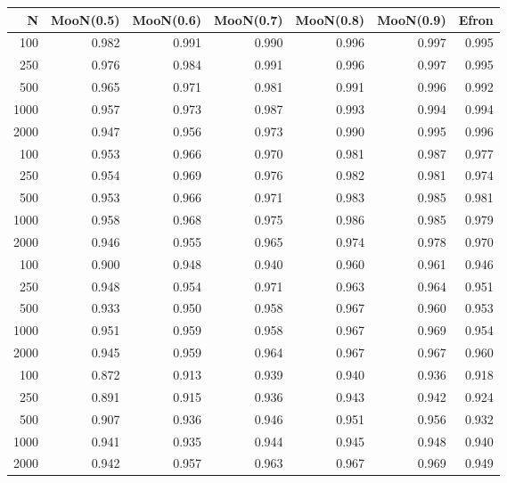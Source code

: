 \begin{table}[ht]
\centering
\begin{tabular}{rrrrrrr}
  \hline
N & MooN(0.5) & MooN(0.6) & MooN(0.7) & MooN(0.8) & MooN(0.9) & Efron \\ 
  \hline
100 & 0.982 & 0.991 & 0.990 & 0.996 & 0.997 & 0.995 \\ 
  250 & 0.976 & 0.984 & 0.991 & 0.996 & 0.997 & 0.995 \\ 
  500 & 0.965 & 0.971 & 0.981 & 0.991 & 0.996 & 0.992 \\ 
  1000 & 0.957 & 0.973 & 0.987 & 0.993 & 0.994 & 0.994 \\ 
  2000 & 0.947 & 0.956 & 0.973 & 0.990 & 0.995 & 0.996 \\ 
  100 & 0.953 & 0.966 & 0.970 & 0.981 & 0.987 & 0.977 \\ 
  250 & 0.954 & 0.969 & 0.976 & 0.982 & 0.981 & 0.974 \\ 
  500 & 0.953 & 0.966 & 0.971 & 0.983 & 0.985 & 0.981 \\ 
  1000 & 0.958 & 0.968 & 0.975 & 0.986 & 0.985 & 0.979 \\ 
  2000 & 0.946 & 0.955 & 0.965 & 0.974 & 0.978 & 0.970 \\ 
  100 & 0.900 & 0.948 & 0.940 & 0.960 & 0.961 & 0.946 \\ 
  250 & 0.948 & 0.954 & 0.971 & 0.963 & 0.964 & 0.951 \\ 
  500 & 0.933 & 0.950 & 0.958 & 0.967 & 0.960 & 0.953 \\ 
  1000 & 0.951 & 0.959 & 0.958 & 0.967 & 0.969 & 0.954 \\ 
  2000 & 0.945 & 0.959 & 0.964 & 0.967 & 0.967 & 0.960 \\ 
  100 & 0.872 & 0.913 & 0.939 & 0.940 & 0.936 & 0.918 \\ 
  250 & 0.891 & 0.915 & 0.936 & 0.943 & 0.942 & 0.924 \\ 
  500 & 0.907 & 0.936 & 0.946 & 0.951 & 0.956 & 0.932 \\ 
  1000 & 0.941 & 0.935 & 0.944 & 0.945 & 0.948 & 0.940 \\ 
  2000 & 0.942 & 0.957 & 0.963 & 0.967 & 0.969 & 0.949 \\ 
   \hline
\end{tabular}
\end{table}
